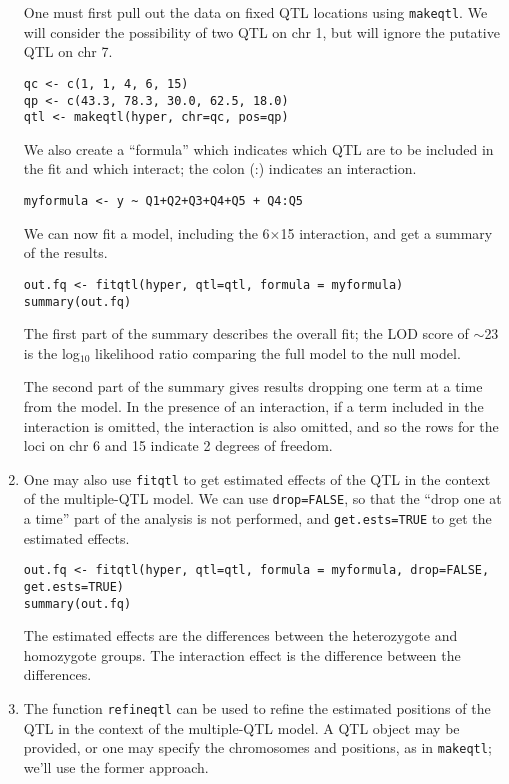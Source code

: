 \documentclass[10pt,letterpaper]{article}
\newcommand{\usercolor}{\color [named]{BlueViolet}}
\begin{document}
\begin{enumerate}
  One must first pull out the data on fixed QTL locations using
  \verb-makeqtl-.  We will consider the possibility of two QTL on
  chr 1, but will ignore the putative QTL on chr 7.

\usercolor \verb|qc <- c(1, 1, 4, 6, 15)| \\
\verb|qp <- c(43.3, 78.3, 30.0, 62.5, 18.0)| \\
\verb|qtl <- makeqtl(hyper, chr=qc, pos=qp)| \normalcolor 

  We also create a ``formula'' which indicates which QTL are to be
  included in the fit and which interact; the colon (:) indicates an
  interaction.  

\usercolor \verb|myformula <- y ~ Q1+Q2+Q3+Q4+Q5 + Q4:Q5| \normalcolor  

  We can now fit a model, including the 6$\times$15 interaction, and
  get a summary of the results.  

\usercolor
\verb|out.fq <- fitqtl(hyper, qtl=qtl, formula = myformula)| \\
\verb|summary(out.fq)|
\normalcolor

The first part of the summary describes the overall fit; the LOD score
of $\sim$23 is the log$_{10}$ likelihood ratio comparing the full
model to the null model.

The second part of the summary gives results dropping one term at a
time from the model.  In the presence of an interaction, if a term
included in the interaction is omitted, the interaction is also
omitted, and so the rows for the loci on chr 6 and 15
indicate 2 degrees of freedom.

\item One may also use \verb-fitqtl- to get estimated effects of the
  QTL in the context of the multiple-QTL model.  We can use
  \verb-drop=FALSE-, so that the ``drop one at a time'' part of the
  analysis is not performed, and \verb-get.ests=TRUE- to get the
  estimated effects.

\usercolor
\verb|out.fq <- fitqtl(hyper, qtl=qtl, formula = myformula, drop=FALSE, get.ests=TRUE)| \\
\verb|summary(out.fq)|
\normalcolor

The estimated effects are the differences between the heterozygote and
homozygote groups.  The interaction effect is the difference
between the differences.

\item The function \verb-refineqtl- can be used to refine the
  estimated positions of the QTL in the context of the multiple-QTL
  model.  A QTL object may be provided, or one may specify the
  chromosomes and positions, as in \verb-makeqtl-; we'll use the
  former approach.


\end{enumerate}
\end{document}
